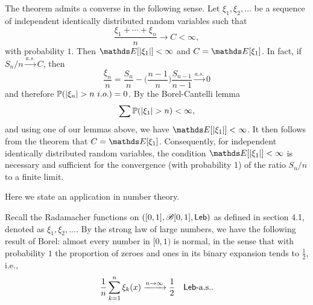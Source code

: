 \begin{remark}
The theorem admits a converse in the following sense. Let $\xi_1, \xi_2, \dots$ be a sequence of independent identically distributed random variables such that
\begin{equation*}
    \frac{\xi_1 + \cdots + \xi_n}{n} \to C < \infty,
\end{equation*}
with probability $1$. Then $\E[|\xi_1|] < \infty$ and $C = \E[\xi_1]$. In fact, if $S_n/n \xrightarrow{a.s.}  C$, then
\begin{equation*}
    \frac{\xi_n}{n} = \frac{S_n}{n} - \bigg( \frac{n-1}{n}\bigg) \frac{S_{n-1}}{n-1} \xrightarrow{a.s.} 0
\end{equation*}
and therefore $\mathbb{P}(|\xi_n| > n \, \, i.o.) = 0$. By the Borel-Cantelli lemma
\begin{equation*}
    \sum \mathbb{P}(|\xi_1| > n) < \infty,
\end{equation*}
and using one of our lemmas above, we have $\E[|\xi_1|] < \infty$. It then follows from the theorem that $C = \E[\xi_1]$. Consequently, for independent identically distributed random variables, the condition $\E[|\xi_1|] < \infty$ is necessary and sufficient for the convergence (with probability 1) of the ratio $S_n/n$ to a finite limit.
\end{remark}


Here we state an application in number theory.
\begin{example}
Recall the Radamacher functions on $([0,1], \mathcal{B}[0,1], \mathsf{Leb})$ as defined in section 4.1, denoted as $\xi_1, \xi_2, ...$. By the strong law of large numbers, we have the following result of Borel: almost every number in $[0, 1)$ is normal, in the sense that with probability $1$ the proportion of zeroes and ones in its binary expansion tends to $\frac12$, i.e.,
\begin{equation*}
    \frac{1}{n} \sum_{k=1}^n \xi_k(x) \xrightarrow{n\to\infty} \frac12 \quad \mathsf{Leb}\text{-a.s.}. 
\end{equation*}
\end{example}

